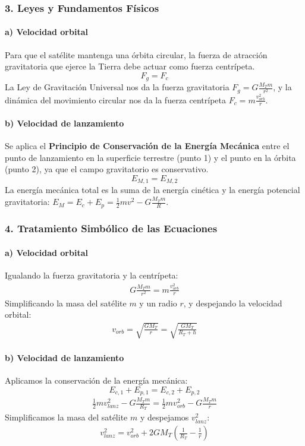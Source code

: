 \subsubsection*{3. Leyes y Fundamentos Físicos}
\paragraph{a) Velocidad orbital}
Para que el satélite mantenga una órbita circular, la fuerza de atracción gravitatoria que ejerce la Tierra debe actuar como fuerza centrípeta.
$$ F_g = F_c $$
La Ley de Gravitación Universal nos da la fuerza gravitatoria $F_g = G \frac{M_T m}{r^2}$, y la dinámica del movimiento circular nos da la fuerza centrípeta $F_c = m \frac{v_{orb}^2}{r}$.

\paragraph{b) Velocidad de lanzamiento}
Se aplica el \textbf{Principio de Conservación de la Energía Mecánica} entre el punto de lanzamiento en la superficie terrestre (punto 1) y el punto en la órbita (punto 2), ya que el campo gravitatorio es conservativo.
$$ E_{M,1} = E_{M,2} $$
La energía mecánica total es la suma de la energía cinética y la energía potencial gravitatoria: $ E_M = E_c + E_p = \frac{1}{2}mv^2 - G\frac{M_T m}{R} $.

\subsubsection*{4. Tratamiento Simbólico de las Ecuaciones}
\paragraph{a) Velocidad orbital}
Igualando la fuerza gravitatoria y la centrípeta:
\begin{gather}
    G \frac{M_T m}{r^2} = m \frac{v_{orb}^2}{r}
\end{gather}
Simplificando la masa del satélite $m$ y un radio $r$, y despejando la velocidad orbital:
\begin{gather}
    v_{orb} = \sqrt{\frac{G M_T}{r}} = \sqrt{\frac{G M_T}{R_T+h}}
\end{gather}

\paragraph{b) Velocidad de lanzamiento}
Aplicamos la conservación de la energía mecánica:
$$ E_{c,1} + E_{p,1} = E_{c,2} + E_{p,2} $$
\begin{gather}
    \frac{1}{2}mv_{lanz}^2 - G\frac{M_T m}{R_T} = \frac{1}{2}mv_{orb}^2 - G\frac{M_T m}{r}
\end{gather}
Simplificamos la masa del satélite $m$ y despejamos $v_{lanz}^2$:
\begin{gather}
    v_{lanz}^2 = v_{orb}^2 + 2GM_T\left(\frac{1}{R_T} - \frac{1}{r}\right)
\end{gather}

